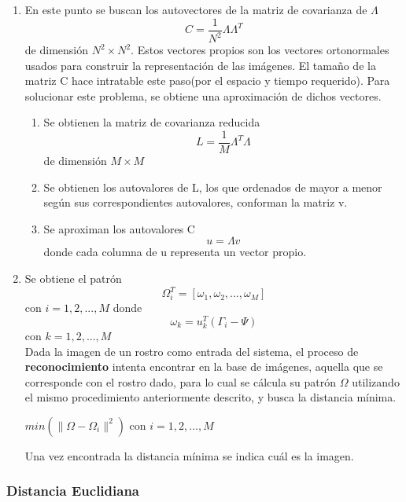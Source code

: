 \documentclass[letterpaper,12pt]{article}
\begin{document}
\begin{enumerate}
\item En este punto se buscan los autovectores de la matriz de covarianza de $\Lambda$
\begin{equation}
C=\dfrac{1}{N^2}\Lambda \Lambda^{T}
\end{equation}
de dimensión $N^2\times N^2$. Estos vectores propios son los vectores ortonormales usados para construir la representación de las imágenes. El tamaño de la matriz C hace intratable este paso(por el espacio y tiempo requerido). Para solucionar este problema, se obtiene una aproximación de dichos vectores.
\begin{enumerate}
\item Se obtienen la matriz de covarianza reducida
\begin{equation}
L=\frac{1}{M}\Lambda^{T}\Lambda 
\end{equation}
de dimensión $M\times M$
\item Se obtienen los autovalores de L, los que ordenados de mayor a menor según sus correspondientes autovalores, conforman la matriz v.
\item Se aproximan los autovalores C
\begin{equation}
u=\Lambda v
\end{equation}
donde cada columna de u representa un vector propio.
\end{enumerate}
\item Se obtiene el patrón 
\begin{equation}
\Omega_{i}^{T}=[\omega_{1},\omega_{2},...,\omega_{M}]
\end{equation}
con  $i=1,2,...,M$ donde 
\begin{equation}
\omega_{k}=u_{k}^{T}(\Gamma_{i}-\Psi)
\end{equation}
con $k=1,2,...,M$\\
Dada la imagen de un rostro como entrada del sistema, el proceso de \textbf{reconocimiento} intenta encontrar en la base de imágenes, aquella que se corresponde con el rostro dado, para lo cual se cálcula su patrón $\Omega$ utilizando el mismo procedimiento anteriormente descrito, y busca la distancia mínima\cite{EigenfaceEspa}.

\begin{center}
$min(\|\Omega-\Omega_{i}\|^2)$ con $i=1,2,...,M $
\end{center}

Una vez encontrada la distancia mínima se indica cuál es la imagen.
\end{enumerate}

\subsubsection{Distancia Euclidiana}
\end{document}
